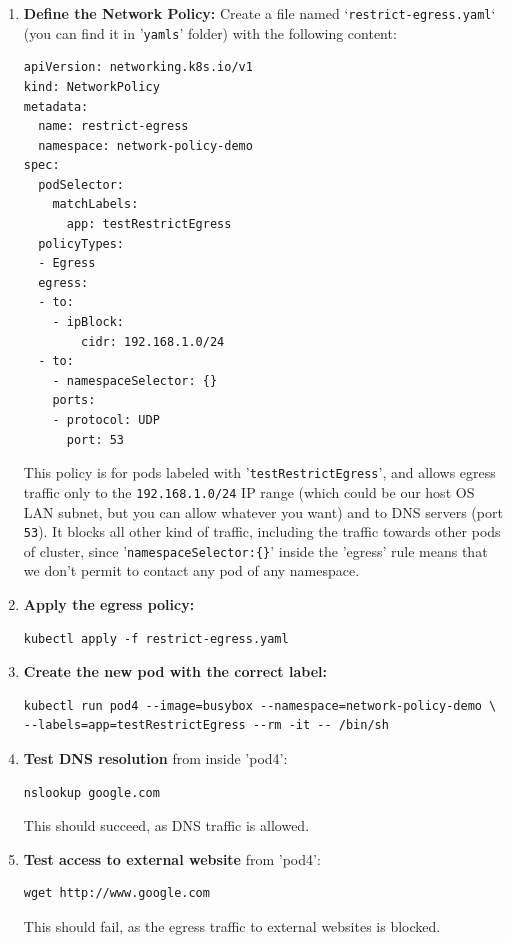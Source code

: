 \documentclass{article}
\begin{document}
\begin{enumerate}
    \item \textbf{Define the Network Policy:}
    Create a file named `\texttt{restrict-egress.yaml}` (you can find it in '\texttt{yamls}' folder) with the following content:
    \begin{lstlisting}
apiVersion: networking.k8s.io/v1
kind: NetworkPolicy
metadata:
  name: restrict-egress
  namespace: network-policy-demo
spec:
  podSelector:
    matchLabels:
      app: testRestrictEgress
  policyTypes:
  - Egress
  egress:
  - to:
    - ipBlock:
        cidr: 192.168.1.0/24
  - to:
    - namespaceSelector: {}
    ports:
    - protocol: UDP
      port: 53
    \end{lstlisting}
    This policy is for pods labeled with '\texttt{testRestrictEgress}', and allows egress traffic only to the \texttt{192.168.1.0/24} IP range (which could be our host OS LAN subnet, but you can allow whatever you want) and to DNS servers (port \texttt{53}). It blocks all other kind of traffic, including the traffic towards other pods of cluster, since '\texttt{namespaceSelector:\{\}}' inside the 'egress' rule means that we don't permit to contact any pod of any namespace.

    \item \textbf{Apply the egress policy:}
    \begin{lstlisting}
kubectl apply -f restrict-egress.yaml
    \end{lstlisting}

    \item \textbf{Create the new pod with the correct label:}
    \begin{lstlisting}
kubectl run pod4 --image=busybox --namespace=network-policy-demo \
--labels=app=testRestrictEgress --rm -it -- /bin/sh
    \end{lstlisting}

    \item \textbf{Test DNS resolution} from inside 'pod4':
    \begin{lstlisting}
nslookup google.com
    \end{lstlisting}
    This should succeed, as DNS traffic is allowed.

    \item \textbf{Test access to external website} from 'pod4':
    \begin{lstlisting}
wget http://www.google.com
    \end{lstlisting}
    This should fail, as the egress traffic to external websites is blocked.


\end{enumerate}
\end{document}
